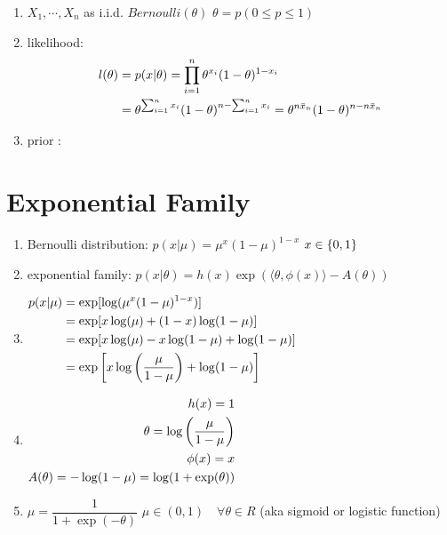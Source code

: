 \begin{enumerate}[itemsep=0.2cm]
    \item $X_1,\cdots, X_n$ as i.i.d. $Bernoulli(\theta)$ 
        \hfill
        $\theta = p (0 \leq p \leq 1)$

    \item likelihood:
    \[
    \begin{aligned}
        l(\theta) 
        &= p(x|\theta)
        = \displaystyle\prod_{i=1}^n \theta^{x_i} (1 - \theta)^{1 - x_i} \\
        &= \theta^{\sum_{i=1}^n x_i} (1 - \theta)^{n - \sum_{i=1}^n x_i}
        = \theta^{n\bar{x}_n} (1 - \theta)^{n - n\bar{x}_n} \\
    \end{aligned}
    \]

    \item prior : 
\end{enumerate}

\section{Exponential Family \cite{mfml-1}} \label{Bernoulli Distribution: Exponential Family}

\begin{enumerate}[itemsep=0.2cm]
    \item Bernoulli distribution: $p(x | \mu) = \mu^x(1 - \mu)^{1-x}$ \hfill $x \in \left\{0, 1\right\}$

    \item exponential family: $p(x | \theta) = h(x) \exp (\langle\theta, \phi(x)\rangle - A(\theta))$

    \item $\begin{aligned}
        p(x | \mu) 
        &= \exp[\log(\mu^x (1 - \mu)^{1-x})] \\
        &= \exp[x \log (\mu) + (1 - x) \log(1 - \mu)] \\
        &= \exp[x \log (\mu) - x \log(1 - \mu) + \log(1 - \mu)] \\
        &= \exp\left[
            x \log\left(\dfrac{\mu}{1 - \mu}\right)
            + \log(1 - \mu)
        \right]
    \end{aligned}$

    \item $\begin{aligned}
        h(x) = 1  \\
        \theta = \log\left(\dfrac{\mu}{1-\mu}\right) \\
        \phi(x) = x \\
        A(\theta) = - \log(1 - \mu) = \log(1 + \exp(\theta))\\
    \end{aligned}$

    \item $\mu = \dfrac{1}{1 + \exp(-\theta)}$ 
        \hfill 
        $\mu \in (0, 1) \quad \forall \theta \in R$
        \hfill 
        (aka sigmoid or logistic function)
    
\end{enumerate}

